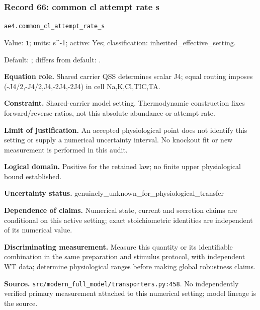 \subsubsection*{Record 66: common cl attempt rate s}
{\small \nolinkurl{ae4.common_cl_attempt_rate_s}\par

Value: \texttt{1}; units: s\textasciicircum{}-1; active: Yes; classification: inherited\_effective\_setting.\par

Default: ; differs from default: .\par

\textbf{Equation role.} Shared carrier QSS determines scalar J4; equal routing imposes (-J4/2,-J4/2,J4,-2J4,-2J4) in cell Na,K,Cl,TIC,TA.\par

\textbf{Constraint.} Shared-carrier model setting. Thermodynamic construction fixes forward/reverse ratios, not this absolute abundance or attempt rate.\par

\textbf{Limit of justification.} An accepted physiological point does not identify this setting or supply a numerical uncertainty interval. No knockout fit or new measurement is performed in this audit.\par

\textbf{Logical domain.} Positive for the retained law; no finite upper physiological bound established.\par

\textbf{Uncertainty status.} genuinely\_unknown\_for\_physiological\_transfer\par

\textbf{Dependence of claims.} Numerical state, current and secretion claims are conditional on this active setting; exact stoichiometric identities are independent of its numerical value.\par

\textbf{Discriminating measurement.} Measure this quantity or its identifiable combination in the same preparation and stimulus protocol, with independent WT data; determine physiological ranges before making global robustness claims.\par

\textbf{Source.} \nolinkurl{src/modern_full_model/transporters.py:458}. No independently verified primary measurement attached to this numerical setting; model lineage is the source.\par}

